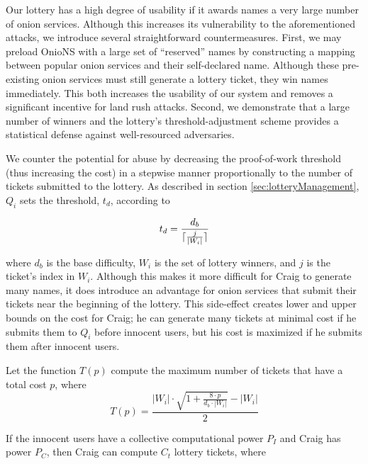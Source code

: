 \documentclass[USenglish,oneside,twocolumn]{article}
\DeclarePairedDelimiter{\ceil}{\lceil}{\rceil}
\newcommand*\nWinners{\left\vert{W_{i}}\right\vert}
\begin{document}
Our lottery has a high degree of usability if it awards names a very large number of onion services. Although this increases its vulnerability to the aforementioned attacks, we introduce several straightforward countermeasures. First, we may preload OnioNS with a large set of ``reserved'' names by constructing a mapping between popular onion services and their self-declared name. Although these pre-existing onion services must still generate a lottery ticket, they win names immediately. This both increases the usability of our system and removes a significant incentive for land rush attacks. Second, we demonstrate that a large number of winners and the lottery's threshold-adjustment scheme provides a statistical defense against well-resourced adversaries.

We counter the potential for abuse by decreasing the proof-of-work threshold (thus increasing the cost) in a stepwise manner proportionally to the number of tickets submitted to the lottery. As described in section \ref{sec:lotteryManagement}, $ Q_{i} $ sets the threshold, $ t_{d} $, according to 

\begin{equation}
	t_{d} = \frac{d_{b}}{\ceil{\frac{j}{\nWinners}}}
\end{equation}

\noindent where $ d_{b} $ is the base difficulty, $ W_{i} $ is the set of lottery winners, and $ j $ is the ticket's index in $ W_{i} $. Although this makes it more difficult for Craig to generate many names, it does introduce an advantage for onion services that submit their tickets near the beginning of the lottery. This side-effect creates lower and upper bounds on the cost for Craig; he can generate many tickets at minimal cost if he submits them to $ Q_{i} $ before innocent users, but his cost is maximized if he submits them after innocent users.

Let the function $ T(p) $ compute the maximum number of tickets that have a total cost $ p $, where
\begin{equation}
	T(p) = \frac{\nWinners \cdot \sqrt{1 + \frac{8 \cdot p}{d_{b} \cdot \nWinners}} - \nWinners}{2}
	\label{eq:nTickets}
\end{equation}

If the innocent users have a collective computational power $ P_{I} $ and Craig has power $ P_{C} $, then Craig can compute $ C_{t} $ lottery tickets, where
\end{document}

